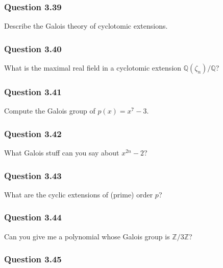 \hypertarget{question-3.39}{%
\subsubsection{Question 3.39}\label{question-3.39}}

Describe the Galois theory of cyclotomic extensions.

\hypertarget{question-3.40}{%
\subsubsection{Question 3.40}\label{question-3.40}}

What is the maximal real field in a cyclotomic extension
\({\mathbb{Q}}(\zeta_n)/{\mathbb{Q}}\)?

\hypertarget{question-3.41}{%
\subsubsection{Question 3.41}\label{question-3.41}}

Compute the Galois group of \(p(x) = x^7 - 3\).

\hypertarget{question-3.42}{%
\subsubsection{Question 3.42}\label{question-3.42}}

What Galois stuff can you say about \(x^{2n} - 2\)?

\hypertarget{question-3.43}{%
\subsubsection{Question 3.43}\label{question-3.43}}

What are the cyclic extensions of (prime) order \(p\)?

\hypertarget{question-3.44}{%
\subsubsection{Question 3.44}\label{question-3.44}}

Can you give me a polynomial whose Galois group is
\({\mathbb{Z}}/3{\mathbb{Z}}\)?

\hypertarget{question-3.45}{%
\subsubsection{Question 3.45}\label{question-3.45}}

